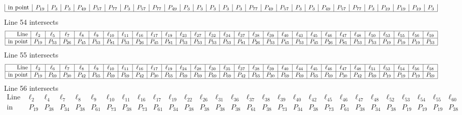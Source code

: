\documentclass{article}
\begin{document}
{$$\begin{array}{|r*{28}{|c}|}
\mbox{in point}  & P_{19} & P_{3} & P_{3} & P_{49} & P_{57} & P_{77} & P_{3} & P_{57} & P_{77} & P_{49} & P_{3} & P_{3} & P_{3} & P_{3} & P_{3} & P_{77} & P_{49} & P_{57} & P_{3} & P_{3} & P_{49} & P_{57} & P_{77} & P_{3} & P_{19} & P_{19} & P_{19} & P_{3}\\
\hline
\end{array}
$$
Line 54 intersects 
$$
\begin{array}{|r*{28}{|c}|}
\hline
\mbox{Line}  & \ell_{2} & \ell_{5} & \ell_{7} & \ell_{8} & \ell_{9} & \ell_{10} & \ell_{11} & \ell_{16} & \ell_{17} & \ell_{19} & \ell_{23} & \ell_{27} & \ell_{32} & \ell_{34} & \ell_{37} & \ell_{38} & \ell_{39} & \ell_{40} & \ell_{43} & \ell_{45} & \ell_{46} & \ell_{47} & \ell_{48} & \ell_{50} & \ell_{53} & \ell_{55} & \ell_{56} & \ell_{59}\\
\hline
\mbox{in point}  & P_{19} & P_{53} & P_{26} & P_{45} & P_{53} & P_{81} & P_{53} & P_{26} & P_{45} & P_{81} & P_{53} & P_{53} & P_{53} & P_{53} & P_{81} & P_{26} & P_{53} & P_{45} & P_{53} & P_{45} & P_{26} & P_{81} & P_{53} & P_{53} & P_{19} & P_{19} & P_{19} & P_{53}\\
\hline
\end{array}
$$
Line 55 intersects 
$$
\begin{array}{|r*{28}{|c}|}
\hline
\mbox{Line}  & \ell_{2} & \ell_{6} & \ell_{7} & \ell_{8} & \ell_{9} & \ell_{10} & \ell_{11} & \ell_{16} & \ell_{17} & \ell_{19} & \ell_{24} & \ell_{28} & \ell_{30} & \ell_{35} & \ell_{37} & \ell_{38} & \ell_{39} & \ell_{40} & \ell_{44} & \ell_{45} & \ell_{46} & \ell_{47} & \ell_{48} & \ell_{51} & \ell_{53} & \ell_{54} & \ell_{56} & \ell_{58}\\
\hline
\mbox{in point}  & P_{19} & P_{69} & P_{30} & P_{42} & P_{65} & P_{69} & P_{69} & P_{42} & P_{30} & P_{65} & P_{69} & P_{69} & P_{69} & P_{69} & P_{42} & P_{65} & P_{30} & P_{69} & P_{69} & P_{65} & P_{69} & P_{30} & P_{42} & P_{69} & P_{19} & P_{19} & P_{19} & P_{69}\\
\hline
\end{array}
$$
Line 56 intersects 
$$
\begin{array}{|r*{28}{|c}|}
\hline
\mbox{Line}  & \ell_{2} & \ell_{4} & \ell_{7} & \ell_{8} & \ell_{9} & \ell_{10} & \ell_{11} & \ell_{16} & \ell_{17} & \ell_{19} & \ell_{22} & \ell_{26} & \ell_{31} & \ell_{36} & \ell_{37} & \ell_{38} & \ell_{39} & \ell_{40} & \ell_{42} & \ell_{45} & \ell_{46} & \ell_{47} & \ell_{48} & \ell_{52} & \ell_{53} & \ell_{54} & \ell_{55} & \ell_{60}\\
\hline
\mbox{in point}  & P_{19} & P_{38} & P_{34} & P_{38} & P_{61} & P_{73} & P_{38} & P_{73} & P_{61} & P_{34} & P_{38} & P_{38} & P_{38} & P_{38} & P_{61} & P_{38} & P_{73} & P_{34} & P_{38} & P_{73} & P_{61} & P_{38} & P_{34} & P_{38} & P_{19} & P_{19} & P_{19} & P_{38}\\

\end{array}$$}
\end{document}
